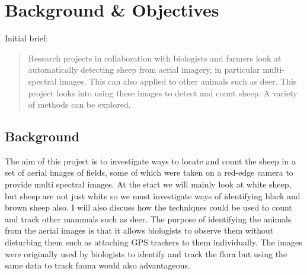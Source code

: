\chapter{Background \& Objectives}
\begin{comment}
    This section should discuss your preparation for the project, including background reading, your analysis of the problem and the process or method you have followed to help structure your work.  It is likely that you will reuse part of your outline project specification, but at the end of the project you should have more to discuss. 

    \textbf{Note}: 

    \begin{itemize}
        \item All of the sections and text in this example are for illustration purposes. The main Chapters are a good starting point, but the content and actual sections that you include are likely to be different.
   
        \item  Look at the document MMP\_S08 Project Report and Technical Work \cite{ProjectReportTechicalWork} for additional guidance.
    \end{itemize}
\end{comment}


Initial brief:

\begin{quote}
Research projects in collaboration with biologists and farmers look at automatically detecting sheep from aerial imagery, in particular multi-spectral images. This can also applied to other animals such as deer. This project looks into using these images to detect and count sheep. A variety of methods can be explored. 
\end{quote}


\section{Background}
\begin{comment}
What was your background preparation for the project? What similar systems or research techniques did you assess? What was your motivation and interest in this project? 
\end{comment}
The aim of this project is to investigate ways to locate and count the sheep in a set of aerial images of fields, some of which were taken on a red-edge camera to provide multi spectral images. At the start we will mainly look at white sheep, but sheep are not just white so we must investigate ways of identifying black and brown sheep also. I will also discuss how the techniques could be used to count and track other mammals such as deer. The purpose of identifying the animals from the aerial images is that it allows biologists to observe them without disturbing them such as attaching GPS trackers to them individually. The images were originally used by biologists to identify and track the flora but using the same data to track fauna would also advantageous.

